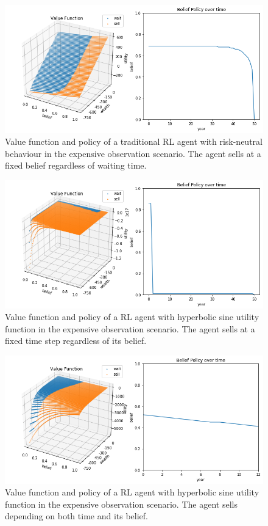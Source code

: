
\begin{figure}
    \includegraphics[width=0.8\linewidth]{img/rational_policy.png}
\caption{Value function and policy of a traditional RL agent with risk-neutral behaviour in the expensive observation scenario. The agent sells at a fixed belief regardless of waiting time.}
\end{figure}

\begin{figure}
    \includegraphics[width=0.8\linewidth]{img/sine_policy.png}
    \caption{Value function and policy of a RL agent with hyperbolic sine utility function in the expensive observation scenario. The agent sells at a fixed time step regardless of its belief.}
\end{figure}

\begin{figure}
    \includegraphics[width=0.8\linewidth]{img/dynamic_policy.png}
    \caption{Value function and policy of a RL agent with hyperbolic sine utility function in the expensive observation scenario. The agent sells depending on both time and its belief.}
\end{figure}
